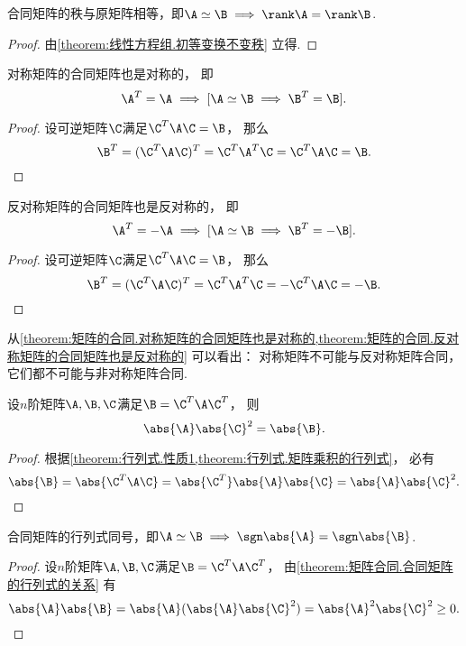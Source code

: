 \begin{property}
合同矩阵的秩与原矩阵相等，即\(\A\simeq\B \implies \rank\A=\rank\B\).
\begin{proof}
由\cref{theorem:线性方程组.初等变换不变秩} 立得.
\end{proof}
\end{property}

\begin{proposition}\label{theorem:矩阵的合同.对称矩阵的合同矩阵也是对称的}
对称矩阵的合同矩阵也是对称的，
即\[
	\A^T = \A
	\implies
	[\A\simeq\B \implies \B^T = \B].
\]
\begin{proof}
设可逆矩阵\(\C\)满足\(\C^T\A\C=\B\)，
那么\[
	\B^T = (\C^T\A\C)^T = \C^T\A^T\C = \C^T\A\C = \B.
	\qedhere
\]
\end{proof}
\end{proposition}

\begin{proposition}\label{theorem:矩阵的合同.反对称矩阵的合同矩阵也是反对称的}
反对称矩阵的合同矩阵也是反对称的，
即\[
	\A^T = -\A
	\implies
	[\A\simeq\B \implies \B^T = -\B].
\]
\begin{proof}
设可逆矩阵\(\C\)满足\(\C^T\A\C=\B\)，
那么\[
	\B^T = (\C^T\A\C)^T = \C^T\A^T\C = -\C^T\A\C = -\B.
	\qedhere
\]
\end{proof}
\end{proposition}

\begin{remark}
从\cref{theorem:矩阵的合同.对称矩阵的合同矩阵也是对称的,theorem:矩阵的合同.反对称矩阵的合同矩阵也是反对称的}
可以看出：
对称矩阵不可能与反对称矩阵合同，
它们都不可能与非对称矩阵合同.
\end{remark}

\begin{proposition}\label{theorem:矩阵合同.合同矩阵的行列式的关系}
设\(n\)阶矩阵\(\A,\B,\C\)满足\(\B=\C^T\A\C^T\)，
则\[
	\abs{\A}\abs{\C}^2
	=\abs{\B}.
\]
\begin{proof}
根据\cref{theorem:行列式.性质1,theorem:行列式.矩阵乘积的行列式}，
必有\[
	\abs{\B}
	=\abs{\C^T\A\C}
	=\abs{\C^T}\abs{\A}\abs{\C}
	=\abs{\A}\abs{\C}^2.
	\qedhere
\]
\end{proof}
\end{proposition}

\begin{proposition}
合同矩阵的行列式同号，即\(\A\simeq\B\implies\sgn\abs{\A}=\sgn\abs{\B}\).
\begin{proof}
设\(n\)阶矩阵\(\A,\B,\C\)满足\(\B=\C^T\A\C^T\)，
由\cref{theorem:矩阵合同.合同矩阵的行列式的关系} 有\[
	\abs{\A}\abs{\B}
	=\abs{\A}(\abs{\A}\abs{\C}^2)
	=\abs{\A}^2\abs{\C}^2 \geq 0.
	\qedhere
\]
\end{proof}
\end{proposition}

